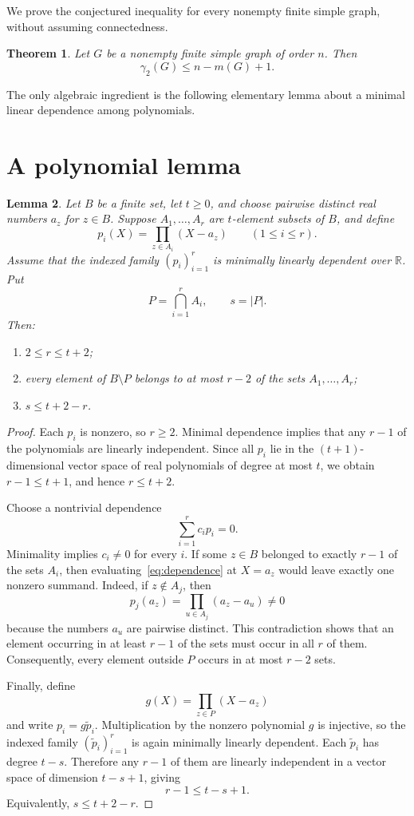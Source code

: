 \documentclass[11pt]{article}
\newtheorem{theorem}{Theorem}
\newtheorem{lemma}[theorem]{Lemma}
\theoremstyle{remark}
\newcommand{\gammatwo}{\gamma_{2}}
\begin{document}
We prove the conjectured inequality for every nonempty finite simple graph,
without assuming connectedness.

\begin{theorem}\label{thm:main}
Let $G$ be a nonempty finite simple graph of order $n$.  Then
\[
  \gammatwo(G)\leq n-m(G)+1.
\]
\end{theorem}

The only algebraic ingredient is the following elementary lemma about a
minimal linear dependence among polynomials.

\section{A polynomial lemma}

\begin{lemma}\label{lem:polynomial}
Let $B$ be a finite set, let $t\geq 0$, and choose pairwise distinct real
numbers $a_z$ for $z\in B$.  Suppose $A_1,\ldots,A_r$ are $t$-element
subsets of $B$, and define
\[
  p_i(X)=\prod_{z\in A_i}(X-a_z) \qquad (1\leq i\leq r).
\]
Assume that the indexed family $(p_i)_{i=1}^{r}$ is minimally linearly
dependent over $\mathbb{R}$.  Put
\[
  P=\bigcap_{i=1}^{r}A_i,
  \qquad s=|P|.
\]
Then:
\begin{enumerate}
  \item $2\leq r\leq t+2$;
  \item every element of $B\setminus P$ belongs to at most $r-2$ of the sets
        $A_1,\ldots,A_r$;
  \item $s\leq t+2-r$.
\end{enumerate}
\end{lemma}

\begin{proof}
Each $p_i$ is nonzero, so $r\geq 2$.  Minimal dependence implies that any
$r-1$ of the polynomials are linearly independent.  Since all $p_i$ lie in
the $(t+1)$-dimensional vector space of real polynomials of degree at most
$t$, we obtain $r-1\leq t+1$, and hence $r\leq t+2$.

Choose a nontrivial dependence
\begin{equation}\label{eq:dependence}
  \sum_{i=1}^{r}c_i p_i=0.
\end{equation}
Minimality implies $c_i\neq 0$ for every $i$.  If some $z\in B$ belonged to
exactly $r-1$ of the sets $A_i$, then evaluating~\eqref{eq:dependence} at
$X=a_z$ would leave exactly one nonzero summand.  Indeed, if $z\notin A_j$,
then
\[
  p_j(a_z)=\prod_{u\in A_j}(a_z-a_u)\neq 0
\]
because the numbers $a_u$ are pairwise distinct.  This contradiction shows
that an element occurring in at least $r-1$ of the sets must occur in all
$r$ of them.  Consequently, every element outside $P$ occurs in at most
$r-2$ sets.

Finally, define
\[
  g(X)=\prod_{z\in P}(X-a_z)
\]
and write $p_i=g\widetilde p_i$.  Multiplication by the nonzero polynomial
$g$ is injective, so the indexed family $(\widetilde p_i)_{i=1}^{r}$ is again
minimally linearly dependent.  Each $\widetilde p_i$ has degree $t-s$.
Therefore any $r-1$ of them are linearly independent in a vector space of
dimension $t-s+1$, giving
\[
  r-1\leq t-s+1.
\]
Equivalently, $s\leq t+2-r$.
\end{proof}
\end{document}
